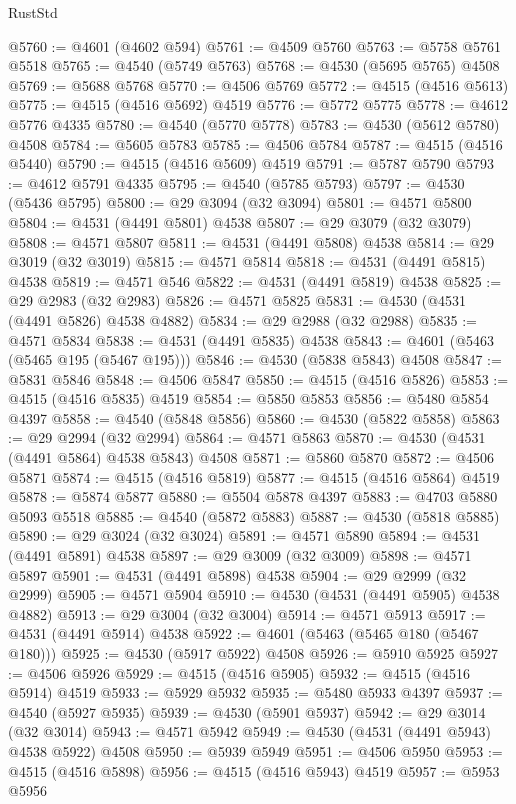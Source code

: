\begin{lexlean}{RustStd}
\begin{coremodule}
{\begin{coremodule}
{{{{{{{{{{{{{{{{{{{{{{{{{{{{{{{{{{{{{{{{{{{{{{{{{{{{{{{@5760 := @4601 (@4602 @594)
@5761 := @4509 @5760
@5763 := @5758 @5761 @5518
@5765 := @4540 (@5749 @5763)
@5768 := @4530 (@5695 @5765) @4508
@5769 := @5688 @5768
@5770 := @4506 @5769
@5772 := @4515 (@4516 @5613)
@5775 := @4515 (@4516 @5692) @4519
@5776 := @5772 @5775
@5778 := @4612 @5776 @4335
@5780 := @4540 (@5770 @5778)
@5783 := @4530 (@5612 @5780) @4508
@5784 := @5605 @5783
@5785 := @4506 @5784
@5787 := @4515 (@4516 @5440)
@5790 := @4515 (@4516 @5609) @4519
@5791 := @5787 @5790
@5793 := @4612 @5791 @4335
@5795 := @4540 (@5785 @5793)
@5797 := @4530 (@5436 @5795)
@5800 := @29 @3094 (@32 @3094)
@5801 := @4571 @5800
@5804 := @4531 (@4491 @5801) @4538
@5807 := @29 @3079 (@32 @3079)
@5808 := @4571 @5807
@5811 := @4531 (@4491 @5808) @4538
@5814 := @29 @3019 (@32 @3019)
@5815 := @4571 @5814
@5818 := @4531 (@4491 @5815) @4538
@5819 := @4571 @546
@5822 := @4531 (@4491 @5819) @4538
@5825 := @29 @2983 (@32 @2983)
@5826 := @4571 @5825
@5831 := @4530 (@4531 (@4491 @5826) @4538 @4882)
@5834 := @29 @2988 (@32 @2988)
@5835 := @4571 @5834
@5838 := @4531 (@4491 @5835) @4538
@5843 := @4601 (@5463 (@5465 @195 (@5467 @195)))
@5846 := @4530 (@5838 @5843) @4508
@5847 := @5831 @5846
@5848 := @4506 @5847
@5850 := @4515 (@4516 @5826)
@5853 := @4515 (@4516 @5835) @4519
@5854 := @5850 @5853
@5856 := @5480 @5854 @4397
@5858 := @4540 (@5848 @5856)
@5860 := @4530 (@5822 @5858)
@5863 := @29 @2994 (@32 @2994)
@5864 := @4571 @5863
@5870 := @4530 (@4531 (@4491 @5864) @4538 @5843) @4508
@5871 := @5860 @5870
@5872 := @4506 @5871
@5874 := @4515 (@4516 @5819)
@5877 := @4515 (@4516 @5864) @4519
@5878 := @5874 @5877
@5880 := @5504 @5878 @4397
@5883 := @4703 @5880 @5093 @5518
@5885 := @4540 (@5872 @5883)
@5887 := @4530 (@5818 @5885)
@5890 := @29 @3024 (@32 @3024)
@5891 := @4571 @5890
@5894 := @4531 (@4491 @5891) @4538
@5897 := @29 @3009 (@32 @3009)
@5898 := @4571 @5897
@5901 := @4531 (@4491 @5898) @4538
@5904 := @29 @2999 (@32 @2999)
@5905 := @4571 @5904
@5910 := @4530 (@4531 (@4491 @5905) @4538 @4882)
@5913 := @29 @3004 (@32 @3004)
@5914 := @4571 @5913
@5917 := @4531 (@4491 @5914) @4538
@5922 := @4601 (@5463 (@5465 @180 (@5467 @180)))
@5925 := @4530 (@5917 @5922) @4508
@5926 := @5910 @5925
@5927 := @4506 @5926
@5929 := @4515 (@4516 @5905)
@5932 := @4515 (@4516 @5914) @4519
@5933 := @5929 @5932
@5935 := @5480 @5933 @4397
@5937 := @4540 (@5927 @5935)
@5939 := @4530 (@5901 @5937)
@5942 := @29 @3014 (@32 @3014)
@5943 := @4571 @5942
@5949 := @4530 (@4531 (@4491 @5943) @4538 @5922) @4508
@5950 := @5939 @5949
@5951 := @4506 @5950
@5953 := @4515 (@4516 @5898)
@5956 := @4515 (@4516 @5943) @4519
@5957 := @5953 @5956
}}}}}}}}}}}}}}}}}}}}}}}}}}}}}}}}}}}}}}}}}}}}}}}}}}}}}}}
\end{coremodule}}
\end{coremodule}
\end{lexlean}
